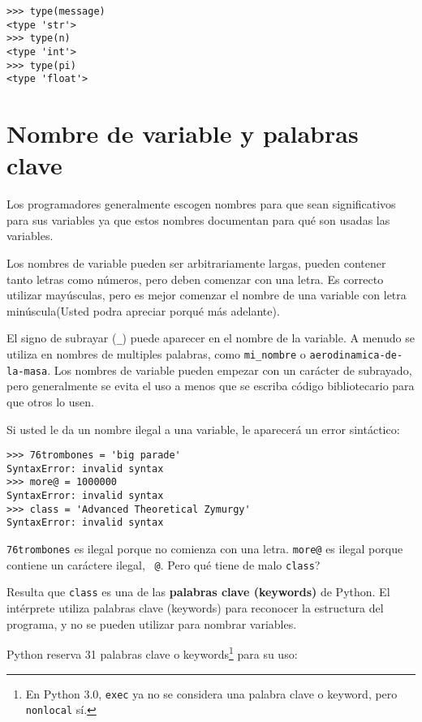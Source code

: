 \beforeverb
\begin{verbatim}
>>> type(message)
<type 'str'>
>>> type(n)
<type 'int'>
>>> type(pi)
<type 'float'>
\end{verbatim}
\afterverb
%

\section{Nombre de variable y palabras clave}

Los programadores generalmente escogen nombres para que sean significativos para sus variables ya que estos nombres documentan  para qu\'e son usadas las variables.

Los nombres de variable pueden ser arbitrariamente largas, pueden contener tanto letras como n\'umeros, pero deben comenzar con una letra. Es correcto utilizar may\'usculas, pero es mejor comenzar el nombre de una variable con letra min\'uscula(Usted podra apreciar porqu\'e m\'as adelante).

El signo de subrayar (\verb"_") puede aparecer en el nombre de la variable.
A menudo se utiliza en nombres de multiples palabras, como
\verb"mi_nombre" o \verb"aerodinamica-de-la-masa".
Los nombres de variable pueden empezar con un car\'acter de subrayado, pero generalmente se evita el uso a menos que se escriba c\'odigo bibliotecario para que otros lo usen.


Si usted le da un nombre ilegal a una variable, le aparecer\'a un error sint\'actico:

\beforeverb
\begin{verbatim}
>>> 76trombones = 'big parade'
SyntaxError: invalid syntax
>>> more@ = 1000000
SyntaxError: invalid syntax
>>> class = 'Advanced Theoretical Zymurgy'
SyntaxError: invalid syntax
\end{verbatim}
\afterverb
%
{\tt 76trombones} es ilegal porque no comienza con una letra.
{\tt more@} es ilegal porque contiene un car\'actere ilegal, {\tt
@}.  Pero qu\'e tiene de malo {\tt class}?

Resulta que {\tt class} es una de las {\bf palabras clave (keywords)} de Python.  El int\'erprete utiliza palabras clave (keywords) para reconocer la estructura del programa,
y no se pueden utilizar para nombrar variables.


Python reserva 31 palabras clave o keywords\footnote{En Python 3.0, {\tt exec} ya no
se considera una palabra clave o keyword, pero {\tt nonlocal} s\'i.} para su uso:

